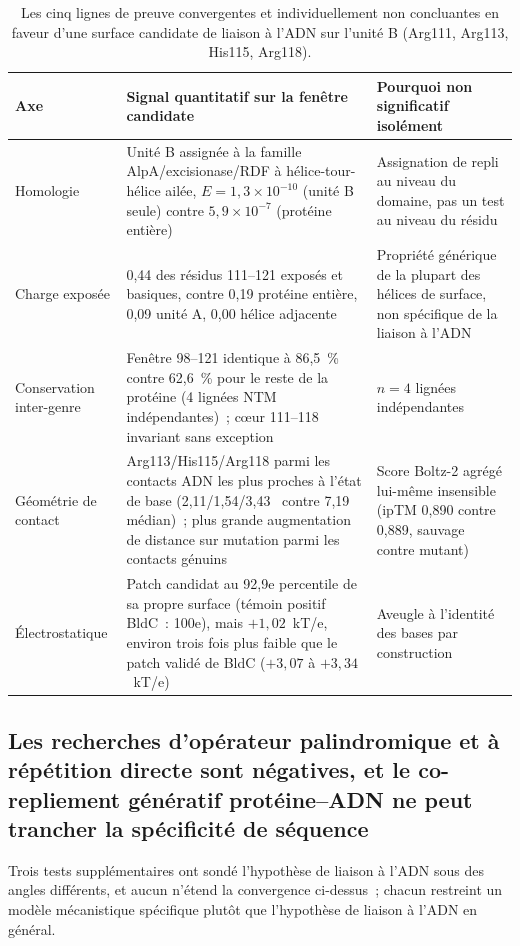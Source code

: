 \documentclass[11pt,a4paper]{article}
\newcommand{\ang}{\text{\AA}}
\begin{document}
\begin{table}[htbp]
\centering
\small
\begin{tabular}{@{}p{2.7cm}p{7.3cm}p{4.3cm}@{}}
\toprule
Axe & Signal quantitatif sur la fenêtre candidate & Pourquoi non significatif isolément \\
\midrule
Homologie & Unité B assignée à la famille AlpA/excisionase/RDF à hélice-tour-hélice ailée,
$E=1,3\times10^{-10}$ (unité B seule) contre $5,9\times10^{-7}$ (protéine entière) & Assignation
de repli au niveau du domaine, pas un test au niveau du résidu \\
Charge exposée & 0,44 des résidus 111--121 exposés et basiques, contre 0,19 protéine entière, 0,09
unité A, 0,00 hélice adjacente & Propriété générique de la plupart des hélices de surface, non
spécifique de la liaison à l'ADN \\
Conservation inter-genre & Fenêtre 98--121 identique à 86,5~\% contre 62,6~\% pour le reste de la
protéine (4 lignées NTM indépendantes)~; cœur 111--118 invariant sans exception & $n=4$ lignées
indépendantes \\
Géométrie de contact & Arg113/His115/Arg118 parmi les contacts ADN les plus proches à l'état de
base (2,11/1,54/3,43~\ang{} contre 7,19~\ang{} médian)~; plus grande augmentation de distance sur
mutation parmi les contacts génuins & Score Boltz-2 agrégé lui-même insensible (ipTM 0,890 contre
0,889, sauvage contre mutant) \\
Électrostatique & Patch candidat au 92,9e percentile de sa propre surface (témoin positif
BldC~: 100e), mais $+1,02$~kT/e, environ trois fois plus faible que le patch validé de BldC
($+3,07$ à $+3,34$~kT/e) & Aveugle à l'identité des bases par construction \\
\bottomrule
\end{tabular}
\caption{Les cinq lignes de preuve convergentes et individuellement non concluantes en faveur
d'une surface candidate de liaison à l'ADN sur l'unité B (Arg111, Arg113, His115, Arg118).}
\label{tab-convergence}
\end{table}

\subsection{Les recherches d'opérateur palindromique et à répétition directe sont négatives, et le
co-repliement génératif protéine--ADN ne peut trancher la spécificité de séquence}

Trois tests supplémentaires ont sondé l'hypothèse de liaison à l'ADN sous des angles différents, et
aucun n'étend la convergence ci-dessus~; chacun restreint un modèle mécanistique spécifique plutôt
que l'hypothèse de liaison à l'ADN en général.
\end{document}
